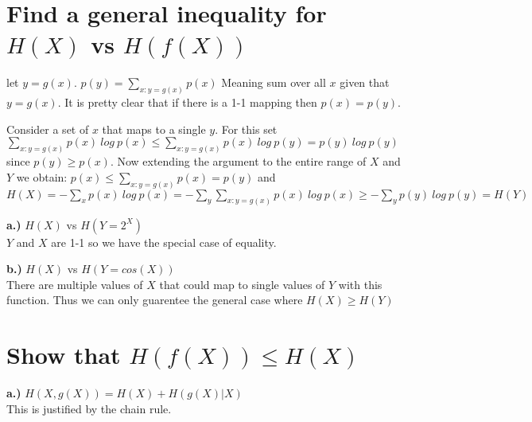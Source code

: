 \documentclass[10pt]{article}
\begin{document}
\begin{tiny}
\begin{multicols}{3}

\fontsize{6pt}{2pt}




\section* {Find a general inequality for $H(X)$ vs $H(f(X))$}
                          let $y=g(x)$. $p(y)=\sum_{x:y=g(x)}p(x)$ Meaning sum over all $x$ given that $y=g(x)$. It is pretty clear that if there is a 1-1 mapping then $p(x)=p(y)$. 
                          
                          Consider a set of $x$ that maps to a single $y$. For this set $\sum_{x:y=g(x)}p(x)\ log\ p(x) \leq \sum_{x:y=g(x)}p(x)\ log\ p(y) = p(y)\ log\ p(y)$ since $p(y)\geq p(x)$. Now extending the argument to the entire range of $X$ and $Y$ we obtain:
          \(
          p(x)\leq \sum_{x:y=g(x)}p(x)=p(y)\) and \(
          H(X)=-\sum_{x}p(x)\ log\ p(x)
          =-\sum_{y}\sum_{x:y=g(x)}p(x)\ log\ p(x)
          \geq -\sum_{y}p(y)\ log\ p(y)
          =H(Y)
          \)

          {\bf a.)} $H(X)$ vs $H(Y=2^{X})$\\
           $Y$ and $X$ are 1-1 so we have the special case of equality.

          {\bf b.)} $H(X)$ vs $H(Y=cos(X))$ \\
            There are multiple values of $X$ that could map to single values of $Y$ with this function. Thus we can only guarentee the general case where $H(X) \geq H(Y)$

\section*{ Show that $H(f(X))\leq H(X)$}
                  {\bf a.)} $H(X,g(X))=H(X) + H(g(X) | X)$\\
                    This is justified by the chain rule.
                    

\end{multicols}
\end{tiny}
\end{document}
